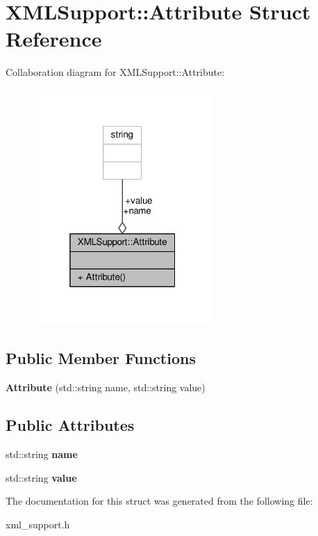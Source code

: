 \hypertarget{structXMLSupport_1_1Attribute}{}\section{X\+M\+L\+Support\+:\+:Attribute Struct Reference}
\label{structXMLSupport_1_1Attribute}


Collaboration diagram for X\+M\+L\+Support\+:\+:Attribute\+:
\nopagebreak
\begin{figure}[H]
\begin{center}
\leavevmode
\includegraphics[width=193pt]{dc/d3f/structXMLSupport_1_1Attribute__coll__graph}
\end{center}
\end{figure}
\subsection*{Public Member Functions}
\begin{DoxyCompactItemize}
\item 
{\bfseries Attribute} (std\+::string name, std\+::string value)\hypertarget{structXMLSupport_1_1Attribute_a114fd8eb14899d691824165a64f0262d}{}\label{structXMLSupport_1_1Attribute_a114fd8eb14899d691824165a64f0262d}

\end{DoxyCompactItemize}
\subsection*{Public Attributes}
\begin{DoxyCompactItemize}
\item 
std\+::string {\bfseries name}\hypertarget{structXMLSupport_1_1Attribute_a78e1afed47ba07aaf3904840d76911fd}{}\label{structXMLSupport_1_1Attribute_a78e1afed47ba07aaf3904840d76911fd}

\item 
std\+::string {\bfseries value}\hypertarget{structXMLSupport_1_1Attribute_aaf6418f7f2049d50fed13026181a9c7b}{}\label{structXMLSupport_1_1Attribute_aaf6418f7f2049d50fed13026181a9c7b}

\end{DoxyCompactItemize}


The documentation for this struct was generated from the following file\+:\begin{DoxyCompactItemize}
\item 
xml\+\_\+support.\+h\end{DoxyCompactItemize}
